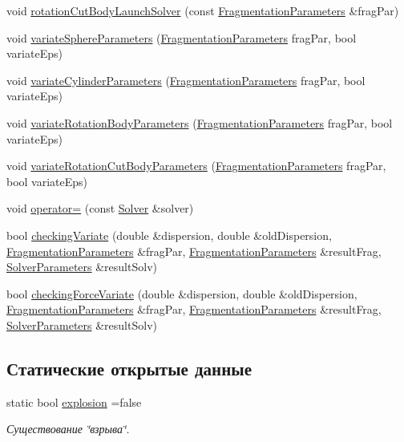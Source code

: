 \begin{DoxyCompactItemize}
\item 
void \mbox{\hyperlink{class_solver_a9c473ff1a6df13539a931cace5dfff45}{rotation\+Cut\+Body\+Launch\+Solver}} (const \mbox{\hyperlink{struct_fragmentation_parameters}{Fragmentation\+Parameters}} \&frag\+Par)
\item 
void \mbox{\hyperlink{class_solver_aa62532c15197fb20b689f8f20e51a187}{variate\+Sphere\+Parameters}} (\mbox{\hyperlink{struct_fragmentation_parameters}{Fragmentation\+Parameters}} frag\+Par, bool variate\+Eps)
\item 
void \mbox{\hyperlink{class_solver_acab3ecdd76d6a1b50ec0b714042e8539}{variate\+Cylinder\+Parameters}} (\mbox{\hyperlink{struct_fragmentation_parameters}{Fragmentation\+Parameters}} frag\+Par, bool variate\+Eps)
\item 
void \mbox{\hyperlink{class_solver_ade1d614110546924f185d41d2d9534ff}{variate\+Rotation\+Body\+Parameters}} (\mbox{\hyperlink{struct_fragmentation_parameters}{Fragmentation\+Parameters}} frag\+Par, bool variate\+Eps)
\item 
void \mbox{\hyperlink{class_solver_a6b420cf828bc7c3f8d45af84af7c0123}{variate\+Rotation\+Cut\+Body\+Parameters}} (\mbox{\hyperlink{struct_fragmentation_parameters}{Fragmentation\+Parameters}} frag\+Par, bool variate\+Eps)
\item 
void \mbox{\hyperlink{class_solver_afe651e3156a48c7c69a027b2604cf469}{operator=}} (const \mbox{\hyperlink{class_solver}{Solver}} \&solver)
\item 
bool \mbox{\hyperlink{class_solver_aa6bcb806c9c27e2749783072e79a1bee}{checking\+Variate}} (double \&dispersion, double \&old\+Dispersion, \mbox{\hyperlink{struct_fragmentation_parameters}{Fragmentation\+Parameters}} \&frag\+Par, \mbox{\hyperlink{struct_fragmentation_parameters}{Fragmentation\+Parameters}} \&result\+Frag, \mbox{\hyperlink{struct_solver_parameters}{Solver\+Parameters}} \&result\+Solv)
\item 
bool \mbox{\hyperlink{class_solver_ac248de801df706a545e4d72a7bf1b9e0}{checking\+Force\+Variate}} (double \&dispersion, double \&old\+Dispersion, \mbox{\hyperlink{struct_fragmentation_parameters}{Fragmentation\+Parameters}} \&frag\+Par, \mbox{\hyperlink{struct_fragmentation_parameters}{Fragmentation\+Parameters}} \&result\+Frag, \mbox{\hyperlink{struct_solver_parameters}{Solver\+Parameters}} \&result\+Solv)
\end{DoxyCompactItemize}
\subsection*{Статические открытые данные}
\begin{DoxyCompactItemize}
\item 
\mbox{\label{class_solver_adcc2d65b392682f9d7b0a0aad09990b8}} 
static bool \mbox{\hyperlink{class_solver_adcc2d65b392682f9d7b0a0aad09990b8}{explosion}} =false
\begin{DoxyCompactList}\small\item\em Существование \char`\"{}взрыва\char`\"{}. \end{DoxyCompactList}\end{DoxyCompactItemize}
